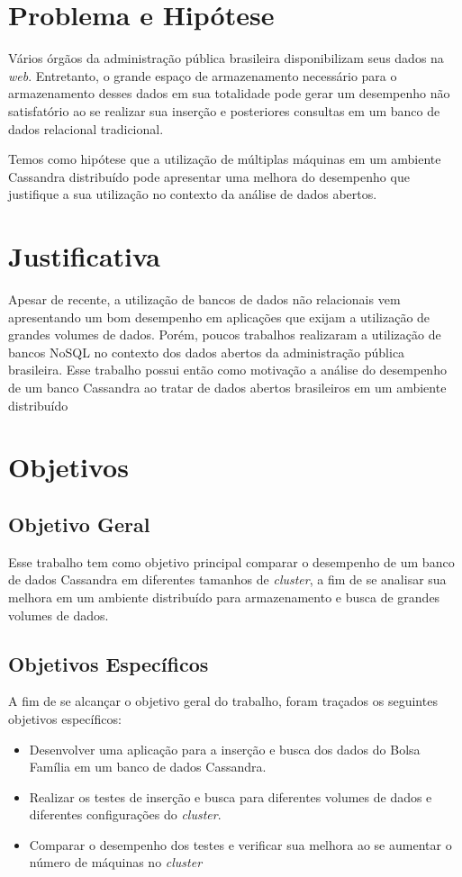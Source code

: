 \section{Problema e Hipótese}
Vários órgãos da administração pública brasileira disponibilizam seus dados na \emph{web}. Entretanto, o grande espaço de armazenamento necessário para o armazenamento desses dados em sua totalidade pode gerar um desempenho não satisfatório ao se realizar sua inserção e posteriores consultas em um banco de dados relacional tradicional.

Temos como hipótese que a utilização de múltiplas máquinas em um ambiente Cassandra distribuído pode apresentar uma melhora do desempenho que justifique a sua utilização no contexto da análise de dados abertos.

\section{Justificativa}
Apesar de recente, a utilização de bancos de dados não relacionais vem apresentando um bom desempenho em aplicações que exijam a utilização de grandes volumes de dados. Porém, poucos trabalhos realizaram a utilização de bancos NoSQL no contexto dos dados abertos da administração pública brasileira. Esse trabalho possui então como motivação a análise do desempenho de um banco Cassandra ao tratar de dados abertos brasileiros em um ambiente distribuído

\section{Objetivos}

\subsection{Objetivo Geral}
Esse trabalho tem como objetivo principal comparar o desempenho de um banco de dados Cassandra em diferentes tamanhos de \emph{cluster}, a fim de se analisar sua melhora em um ambiente distribuído para armazenamento e busca de grandes volumes de dados.

\subsection{Objetivos Específicos}
A fim de se alcançar o objetivo geral do trabalho, foram traçados os seguintes objetivos específicos:
\begin{itemize}
	\item Desenvolver uma aplicação para a inserção e busca dos dados do Bolsa Família em um banco de dados Cassandra.
	
	\item Realizar os testes de inserção e busca para diferentes volumes de dados e diferentes configurações do \emph{cluster}.
	
	\item Comparar o desempenho dos testes e verificar sua melhora ao se aumentar o número de máquinas no \emph{cluster}
\end{itemize}

